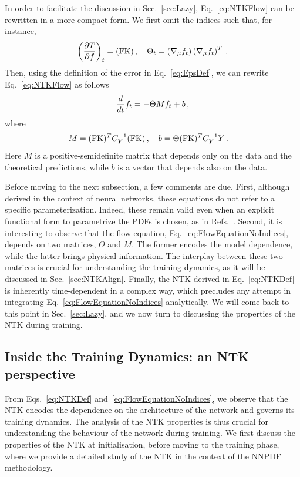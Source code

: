 In order to facilitate the discussion in Sec.~\ref{sec:Lazy},
Eq.~\eqref{eq:NTKFlow} can be rewritten in a more compact form. We first omit
the indices such that, for instance,
\begin{align}
  \left(\frac{\partial T}{\partial f}\right)_t = (\mathrm{FK})\, , \quad
  \Theta_t = \left(\nabla_\mu f_t\right) \left(\nabla_\mu f_t\right)^T\, .
  \label{eq:dTdfForLinearObs}
\end{align}
Then, using the definition of the error in Eq.~\eqref{eq:EpsDef}, we can rewrite
Eq.~\eqref{eq:NTKFlow} as follows
\begin{align}
    \label{eq:FlowEquationNoIndices}
    \frac{d}{dt} f_t = -\Theta M f_t + b\, ,
\end{align}
where
\begin{align}
    M &= (\mathrm{FK})^T C_Y^{-1} (\mathrm{FK})\, , \quad b = \Theta (\mathrm{FK})^T C_Y^{-1} Y\, .
    \label{eq:MandBDef}
\end{align}
Here $M$ is a positive-semidefinite matrix that depends only on the data and the
theoretical predictions, while $b$ is a vector that depends also on the data.

Before moving to the next subsection, a few comments are due. First, although
derived in the context of neural networks, these equations do not refer to a
specific parameterization. Indeed, these remain valid even when an explicit
functional form to parametrize the PDFs is chosen, as \eg in
Refs.~\cite{Bailey:2020ooq,Hou:2019efy,Costantini:2025wxp}. Second, it is
interesting to observe that the flow equation,
Eq.~\eqref{eq:FlowEquationNoIndices}, depends on two matrices, $\Theta$ and $M$.
The former encodes the model dependence, while the latter brings physical
information. The interplay between these two matrices is crucial for
understanding the training dynamics, as it will be discussed in
Sec.~\ref{sec:NTKAlign}. Finally, the NTK derived in Eq.~\ref{eq:NTKDef} is
inherently time-dependent in a complex way, which precludes any attempt in
integrating Eq.~\ref{eq:FlowEquationNoIndices} analytically. We will come back
to this point in Sec.~\ref{sec:Lazy}, and we now turn to discussing the
properties of the NTK during training.

\subsection{Inside the Training Dynamics: an NTK perspective}

From Eqs.~\eqref{eq:NTKDef} and~\eqref{eq:FlowEquationNoIndices}, we observe
that the NTK encodes the dependence on the architecture of the network and
governs its training dynamics. The analysis of the NTK properties is thus
crucial for understanding the behaviour of the network during training. We first
discuss the properties of the NTK at initialisation, before moving to the
training phase, where we provide a detailed study of the NTK in the context of
the NNPDF methodology.

